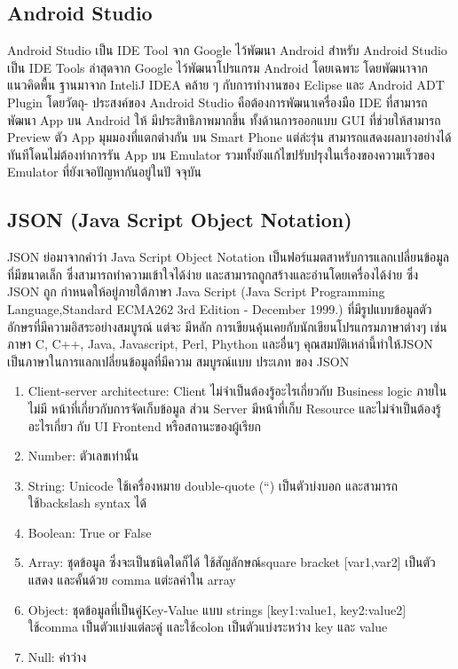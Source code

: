 \subsection{Android Studio}
Android Studio \cite{android_studio} เป็น IDE Tool จาก Google ไว้พัฒนา Android สําหรับ Android Studio
เป็น IDE Tools ล่าสุดจาก Google ไว้พัฒนาโปรแกรม Android โดยเฉพาะ โดยพัฒนาจากแนวคิดพื้น
ฐานมาจาก InteliJ IDEA คล้าย ๆ กับการทํางานของ Eclipse และ Android ADT Plugin โดยวัตถุ-
ประสงค์ของ Android Studio คือต้องการพัฒนาเครื่องมือ IDE ที่สามารถพัฒนา App บน Android ให้
มีประสิทธิภาพมากขึ้น ทั้งด้านการออกแบบ GUI ที่ช่วยให้สามารถ Preview ตัว App มุมมองที่แตกต่างกัน
บน Smart Phone แต่ล่ะรุ่น สามารถแสดงผลบางอย่างได้ทันทีโดนไม่ต้องทําการรัน App บน Emulator
รวมทั้งยังแก้ไขปรับปรุงในเรื่องของความเร็วของ Emulator ที่ยังเจอปัญหากันอยู่ในปั จจุบัน

\subsection{JSON (Java Script Object Notation)}
JSON \cite{json} ย่อมาจากคําว่า Java Script Object Notation เป็นฟอร์แมตสาหรับการแลกเปลี่ยนข้อมูล
ที่มีขนาดเล็ก ซึ่งสามารถทําความเข้าใจได้ง่าย และสามารถถูกสร้างและอ่านโดยเครื่องได้ง่าย ซึ่ง JSON ถูก
กําหนดให้อยู่ภายใต้ภาษา Java Script (Java Script Programming Language,Standard ECMA262
3rd Edition - December 1999.) ที่มีรูปแบบข้อมูลตัวอักษรที่มีความอิสระอย่างสมบูรณ์ แต่จะ มีหลัก
การเขียนคุ้นเคยกับนักเขียนโปรแกรมภาษาต่างๆ เช่น ภาษา C, C++, Java, Javascript, Perl, Phython
และอื่นๆ คุณสมบัติเหล่านี้ทําให้JSON เป็นภาษาในการแลกเปลี่ยนข้อมูลที่มีความ สมบูรณ์แบบ ประเภท
ของ JSON
\begin{enumerate}
  \item  Client-server architecture: Client ไม่จําเป็นต้องรู้อะไรเกี่ยวกับ Business logic ภายใน ไม่มี
  หน้าที่เกี่ยวกับการจัดเก็บข้อมูล ส่วน Server มีหน้าที่เก็บ Resource และไม่จําเป็นต้องรู้อะไรเกี่ยว
  กับ UI Frontend หรือสถานะของผู้เรียก
  

  \item  Number: ตัวเลขเท่านั้น
  
  \item String: Unicode ใช้เครื่องหมาย double-quote (“) เป็นตัวบ่งบอก และสามารถใช้backslash
  syntax ได้
  
  \item Boolean: True or False
  \item    Array: ชุดข้อมูล ซึ่งจะเป็นชนิดใดก็ได้ ใช้สัญลักษณ์square bracket [var1,var2] เป็นตัวแสดง
  และคั้นด้วย comma แต่ะลค่าใน array
  \item  Object: ชุดข้อมูลที่เป็นคู่Key-Value แบบ strings [key1:value1, key2:value2] ใช้comma
  เป็นตัวแบ่งแต่ละคู่ และใช้colon เป็นตัวแบ่งระหว่าง key และ value
  \item    Null: ค่าว่าง
\end{enumerate}

